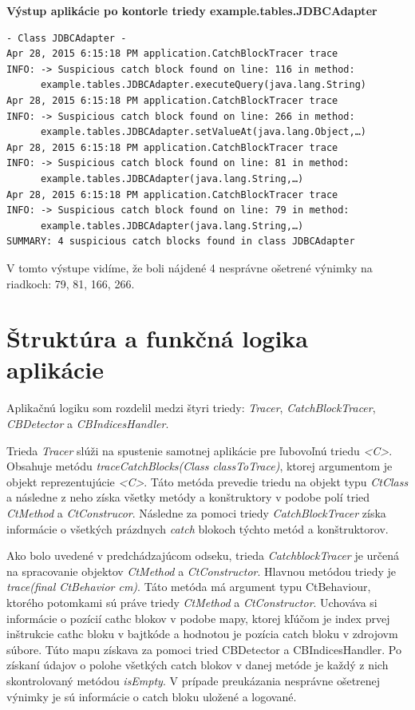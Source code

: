 \documentclass[11pt,final,oneside]{fithesis}
\newenvironment{example}[1]
{
\vspace{3mm}
\noindent\textbf{#1}
\vspace{2mm}
}
{
\vspace{3mm}
}
\begin{document}
\begin{example}{Výstup aplikácie po kontorle triedy example.tables.JDBCAdapter}
\begin{verbatim}
- Class JDBCAdapter -
Apr 28, 2015 6:15:18 PM application.CatchBlockTracer trace
INFO: -> Suspicious catch block found on line: 116 in method:
      example.tables.JDBCAdapter.executeQuery(java.lang.String)
Apr 28, 2015 6:15:18 PM application.CatchBlockTracer trace
INFO: -> Suspicious catch block found on line: 266 in method:
      example.tables.JDBCAdapter.setValueAt(java.lang.Object,…)
Apr 28, 2015 6:15:18 PM application.CatchBlockTracer trace
INFO: -> Suspicious catch block found on line: 81 in method:
      example.tables.JDBCAdapter(java.lang.String,…)
Apr 28, 2015 6:15:18 PM application.CatchBlockTracer trace
INFO: -> Suspicious catch block found on line: 79 in method:
      example.tables.JDBCAdapter(java.lang.String,…)
SUMMARY: 4 suspicious catch blocks found in class JDBCAdapter
\end{verbatim}
\end{example}

V tomto výstupe vidíme, že boli nájdené 4 nesprávne ošetrené výnimky na riadkoch: 79, 81, 166, 266.

\section{Štruktúra a funkčná logika aplikácie}

Aplikačnú logiku som rozdelil medzi štyri triedy: \textit{Tracer}, \textit{CatchBlockTracer}, \textit{CBDetector} a \textit{CBIndicesHandler}. 

Trieda \textit{Tracer} slúži na spustenie samotnej aplikácie pre ľubovoľnú triedu \textit{<C>}. Obsahuje metódu \textit{traceCatchBlocks(Class classToTrace)}, ktorej argumentom je objekt reprezentujúcie \textit{<C>}. Táto metóda prevedie triedu na objekt typu \textit{CtClass} a následne z neho získa všetky metódy a konštruktory v podobe polí tried \textit{CtMethod} a \textit{CtConstrucor}. Následne za pomoci triedy \textit{CatchBlockTracer} získa informácie o všetkých prázdnych \textit{catch} blokoch týchto metód a konštruktorov. 

Ako bolo uvedené v predchádzajúcom odseku, trieda \textit{CatchblockTracer} je určená na spracovanie objektov \textit{CtMethod} a \textit{CtConstructor}. Hlavnou metódou triedy je \textit{trace(final CtBehavior cm)}. Táto metóda má argument typu CtBehaviour, ktorého potomkami sú práve triedy \textit{CtMethod} a \textit{CtConstructor}. Uchováva si informácie o pozícií cathc blokov v podobe mapy, ktorej kľúčom je index prvej inštrukcie cathc bloku v bajtkóde a hodnotou je pozícia catch bloku v zdrojovm súbore. Túto mapu získava za pomoci tried CBDetector a CBIndicesHandler. Po získaní údajov o polohe všetkých catch blokov v danej metóde je každý z nich skontrolovaný metódou \textit{isEmpty}. V prípade preukázania nesprávne ošetrenej výnimky je sú informácie o catch bloku uložené a logované. 
\end{document}
